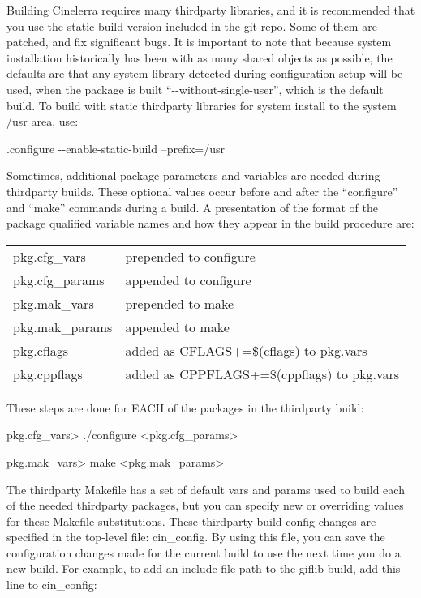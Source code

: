 Building Cinelerra requires many thirdparty libraries, and it is recommended that you use the static build version included in the git repo. Some of them are patched, and fix significant bugs. It is important to note that because system installation historically has been with as many shared objects as possible, the defaults are that any system library detected during configuration setup will be used, when the package is built ``-{}-without-single-user'', which is the default build. To build with static thirdparty libraries for system install to the system /usr area, use:
\smallskip

\hspace{2em}.configure -{}-enable-static-build --prefix=/usr
\medskip

Sometimes, additional package parameters and variables are needed during thirdparty builds. These optional values occur before and after the ``configure'' and ``make'' commands during a build. A presentation of the format of the package qualified variable names and how they appear in the build procedure are:
\medskip

\hspace{2em}
\begin{tabular}{@{}ll}
	pkg.cfg\_vars & prepended to configure\\
	pkg.cfg\_params & appended to configure\\
	pkg.mak\_vars & prepended to make\\
	pkg.mak\_params & appended to make\\
    pkg.cflags & added as CFLAGS+=\$(cflags) to pkg.vars\\
	pkg.cppflags & added as CPPFLAGS+=\$(cppflags) to pkg.vars\\
\end{tabular}
\bigskip

These steps are done for EACH of the packages in the thirdparty build:
\smallskip

\hspace{2em}{\textless}pkg.cfg\_vars{\textgreater} ./configure {\textless}pkg.cfg\_params{\textgreater}

\hspace{2em}{\textless}pkg.mak\_vars{\textgreater} make {\textless}pkg.mak\_params{\textgreater}
\bigskip

The thirdparty Makefile has a set of default vars and params used to build each of the needed thirdparty packages, but you can specify new or overriding values for these Makefile substitutions. These thirdparty build config changes are specified in the top-level file: cin\_config. By using this file, you can save the configuration changes made for the current build to use the next time you do a new build. For example, to add an include file path to the giflib build, add this line to cin\_config:
\medskip

